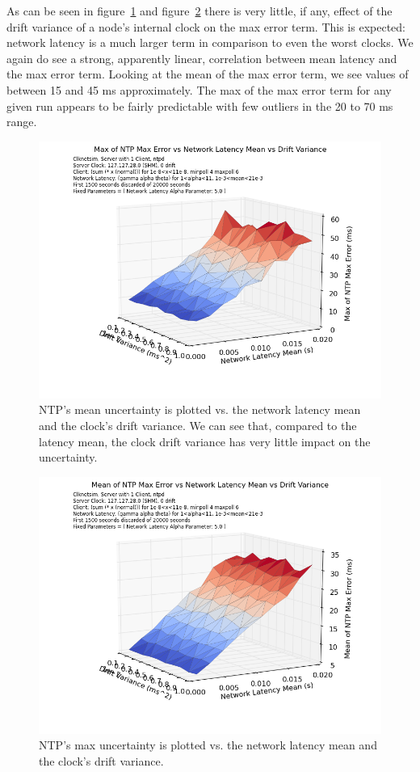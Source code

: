 As can be seen in figure~\ref{fig:max-uncertainty_latency-mean_drift-variance} and 
figure~\ref{fig:mean-uncertainty_latency-mean_drift-variance} there is very little, if any,
effect of the drift variance of a node's internal clock on the max
error term. This is expected: network latency is a much larger term in
comparison to even the worst clocks. We again do see a strong,
apparently linear, correlation between mean latency and the max error
term. Looking at the mean of the max error term, we see values of
between 15 and 45 ms approximately. The max of the max error term for
any given run appears to be fairly predictable with few outliers in
the 20 to 70 ms range. 

\begin{figure}[t]
  \caption{NTP's mean uncertainty is plotted vs. the network latency mean and the clock's drift variance. We can see that, compared to the latency mean, the clock drift variance has very little impact on the uncertainty.}
  \label{fig:max-uncertainty_latency-mean_drift-variance}
  \includegraphics[width=0.8\linewidth]{max_max_err-mean_latency-drift_variance.png}
\end{figure}

\begin{figure}[h]
  \caption{NTP's max uncertainty is plotted vs. the network latency mean and the clock's drift variance.}
  \label{fig:mean-uncertainty_latency-mean_drift-variance}
  \includegraphics[width=0.8\linewidth]{mean_max_err-mean_latency-drift_variance.png}
\end{figure}

